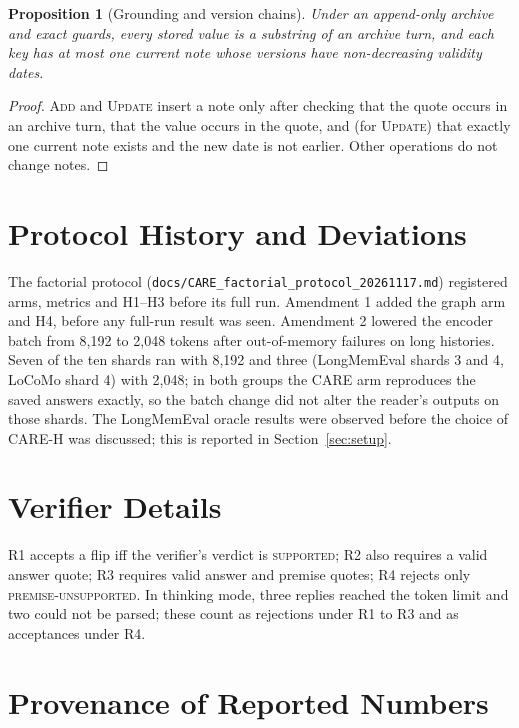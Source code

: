\documentclass[10pt]{article}
\theoremstyle{plain}
\newtheorem{proposition}{Proposition}
\begin{document}
\begin{proposition}[Grounding and version chains]\label{prop:grounding}
Under an append-only archive and exact guards, every stored value is a substring of an archive turn, and each
key has at most one current note whose versions have non-decreasing validity dates.
\end{proposition}
\begin{proof}
\textsc{Add} and \textsc{Update} insert a note only after checking that the quote occurs in an archive turn, that the
value occurs in the quote, and (for \textsc{Update}) that exactly one current note exists and the new date is not
earlier. Other operations do not change notes.
\end{proof}

\section{Protocol History and Deviations}
\label{app:protocol}

The factorial protocol (\texttt{docs/CARE\_factorial\_protocol\_20261117.md}) registered arms, metrics and H1--H3
before its full run. Amendment 1 added the graph arm and H4, before any full-run result was seen. Amendment 2
lowered the encoder batch from 8,192 to 2,048 tokens after out-of-memory failures on long histories. Seven of the
ten shards ran with 8,192 and three (LongMemEval shards 3 and 4, LoCoMo shard 4) with 2,048; in both groups the CARE
arm reproduces the saved answers exactly, so the batch change did not alter the reader's outputs on those shards. The LongMemEval oracle results were
observed before the choice of CARE-H was discussed; this is reported in Section~\ref{sec:setup}.

\section{Verifier Details}
\label{app:verifiers}

R1 accepts a flip iff the verifier's verdict is \textsc{supported}; R2 also requires a valid answer quote; R3
requires valid answer and premise quotes; R4 rejects only \textsc{premise-unsupported}. In thinking mode, three
replies reached the token limit and two could not be parsed; these count as rejections under R1 to R3 and as
acceptances under R4.

\section{Provenance of Reported Numbers}
\label{app:provenance}
\end{document}
